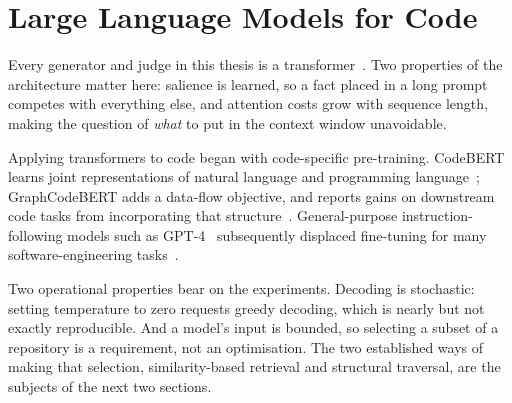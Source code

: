 \section{Large Language Models for Code}
\label{sec:bg-llms}

Every generator and judge in this thesis is a transformer~\cite{vaswani2017attention}.
Two properties of the architecture matter here: salience is learned, so a fact
placed in a long prompt competes with everything else, and attention costs grow
with sequence length, making the question of \emph{what} to put in the context
window unavoidable.

Applying transformers to code began with code-specific pre-training.
CodeBERT learns joint representations of natural language and programming
language~\cite{feng2020codebert}; GraphCodeBERT adds a data-flow objective,
and reports gains on downstream code tasks from incorporating that
structure~\cite{guo2020graphcodebert}. General-purpose
instruction-following models such as GPT-4~\cite{openai2023gpt4} subsequently
displaced fine-tuning for many software-engineering
tasks~\cite{hou2023llmse,fan2023llmse}.

Two operational properties bear on the experiments. Decoding is stochastic:
setting temperature to zero requests greedy decoding, which is nearly but not
exactly reproducible. And a model's input is bounded, so selecting a subset of a
repository is a requirement, not an optimisation. The two established ways of
making that selection, similarity-based retrieval and structural traversal,
are the subjects of the next two sections.
